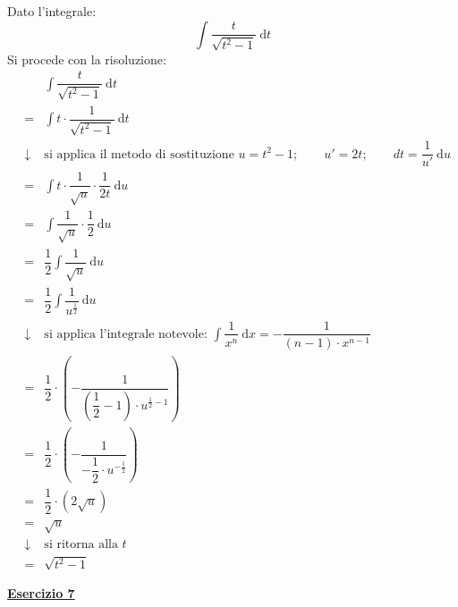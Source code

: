 \documentclass[a4paper]{article}
\newcommand{\example}[1]{\textcolor{Green4}{\textbf{#1}}}
\begin{document}
	\noindent
	Dato l'integrale:
	\begin{equation*}
		\displaystyle \int\dfrac{t}{\sqrt{t^{2} - 1}} \: \mathrm{d}t
	\end{equation*}
	Si procede con la risoluzione:
	\begin{equation*}
		\begin{array}{rcl}
			&& \displaystyle \int\dfrac{t}{\sqrt{t^{2} - 1}} \: \mathrm{d}t \\ [2em]
			&=& \displaystyle \int t \cdot \dfrac{1}{\sqrt{t^{2} - 1}} \: \mathrm{d}t \\ [2em]
			&\downarrow& \text{si applica il metodo di sostituzione } u = t^{2}-1; \hspace{2em} u' = 2t; \hspace{2em} dt = \dfrac{1}{u'} \: \mathrm{d}u \\ [2em]
			&=& \displaystyle \int t \cdot \dfrac{1}{\sqrt{u}} \cdot \dfrac{1}{2t} \: \mathrm{d}u \\ [2em]
			&=& \displaystyle \int \dfrac{1}{\sqrt{u}} \cdot \dfrac{1}{2} \: \mathrm{d}u \\ [2em]
			&=& \dfrac{1}{2} \displaystyle \int \dfrac{1}{\sqrt{u}} \: \mathrm{d}u \\ [2em]
			&=& \dfrac{1}{2} \displaystyle \int \dfrac{1}{u^{\frac{1}{2}}} \: \mathrm{d}u \\ [2em]
			&\downarrow& \text{si applica l'integrale notevole: }\displaystyle\int \dfrac{1}{x^{n}} \: \mathrm{d}x = - \dfrac{1}{\left(n-1\right) \cdot x^{n-1}} \\ [2em]
			&=& \dfrac{1}{2} \cdot \left(-\dfrac{1}{\left(\dfrac{1}{2} - 1\right) \cdot u^{\frac{1}{2}-1}}\right) \\ [2.5em]
			&=& \dfrac{1}{2} \cdot \left(-\dfrac{1}{-\dfrac{1}{2} \cdot u^{-\frac{1}{2}}}\right) \\ [2em]
			&=& \dfrac{1}{2} \cdot \left(2\sqrt{u}\right) \\ [1em]
			&=& \sqrt{u} \\ [1em]
			&\downarrow& \text{si ritorna alla }t \\ [1em]
			&=& \sqrt{t^{2} - 1}
		\end{array}
	\end{equation*}\newpage

	\begin{flushleft}
		\example{\underline{Esercizio 7}}
	\end{flushleft}
	
\end{document}
